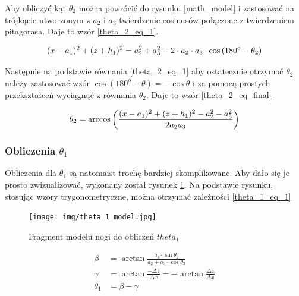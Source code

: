 Aby obliczyć kąt $\theta_2$ można powrócić do rysunku \ref{math_model} i zastosować na trójkącie utworzonym z $a_2$ i $a_3$ twierdzenie cosinusów połączone z twierdzeniem pitagorasa. Daje to wzór \ref{theta_2_eq_1}. \cite{SCARA_model_calc}

\begin{equation} \label{theta_2_eq_1}
(x - a_1)^2 + (z + h_1)^2 = a_2^2 + a_3^2 - 2 \cdot a_2 \cdot a_3 \cdot \cos{(180^o - \theta_2)}\\
\end{equation}

Następnie na podstawie równania \ref{theta_2_eq_1} aby ostatecznie otrzymać $\theta_2$ należy zastosować wzór $\cos{(180^o - \theta)} = -\cos{\theta}$ i za pomocą prostych przekształceń wyciągnąć z równania $\theta_2$. Daje to wzór \ref{theta_2_eq_final} \cite{SCARA_model_calc}

\begin{equation} \label{theta_2_eq_final}
\theta_2 = \arccos{\left( \frac{(x - a_1)^2 + (z + h_1)^2 - a_2^2 - a_3^2}{2 a_2 a_3} \right)}\\ 
\end{equation} 

\subsubsection{Obliczenia $\theta_1$}

Obliczenia dla $\theta_1$ są natomaist trochę bardziej skomplikowane. Aby dało się je prosto zwizualizować, wykonany został rysunek \ref{theta_1_model}. Na podstawie rysunku, stosując wzory trygonometryczne, można otrzymać zależności \ref{theta_1_eq_1} \cite{SCARA_model_calc}

\begin{figure}[h!]
\texttt{[image: img/theta\_1\_model.jpg]}
\caption{Fragment modelu nogi do obliczeń $theta_1$}
\label{theta_1_model}
\end{figure}

\begin{equation}\label{theta_1_eq_1}
\begin{split}
\beta &= \arctan{\frac{a_3 \cdot \sin{\theta_2}}{a_2 + a_3 \cdot{\cos{\theta_2}}}}\\
\gamma &= \arctan{\frac{-\Delta z}{\Delta x}} = - \arctan{\frac{\Delta z}{\Delta x}}\\
\theta_1 &= \beta - \gamma\\
\end{split}
\end{equation}

